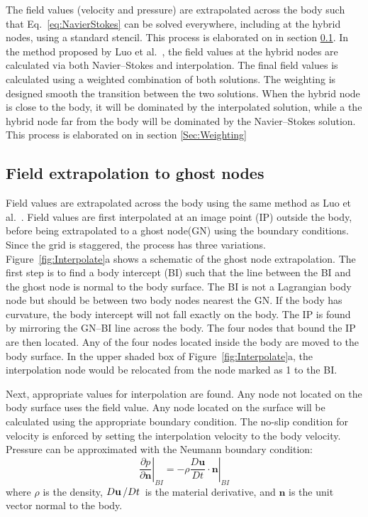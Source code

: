 \documentclass[onehalf,11pt]{beavtex}
\begin{document}
The field values (velocity and pressure) are extrapolated across the body such that Eq.~\eqref{eq:NavierStokes} can be solved everywhere, including at the hybrid nodes, using a standard stencil. 
This process is elaborated on in section \ref{Sec:Field Extrapolation}. 
In the method proposed by Luo et al.~\cite{Luo:2012gx}, the field values at the hybrid nodes are calculated via both Navier--Stokes and interpolation. 
The final field values is calculated using a weighted combination of both solutions.
The weighting is designed smooth the transition between the two solutions. 
When the hybrid node is close to the body, it will be dominated by the interpolated solution, while a the hybrid node far from the body will be dominated by the Navier--Stokes solution. 
This process is elaborated on in section \ref{Sec:Weighting}

\subsection{Field extrapolation to ghost nodes}
\label{Sec:Field Extrapolation}

Field values are extrapolated across the body using the same method as Luo et al.~\cite{Luo:2012gx}.
Field values are first interpolated at an image point (IP) outside the body, before being extrapolated to a ghost node(GN) using the boundary conditions.
Since the grid is staggered, the process has three variations.
Figure~\ref{fig:Interpolate}a shows a schematic of the ghost node extrapolation.
The first step is to find a body intercept (BI) such that the line between the BI and the ghost node is normal to the body surface.
The BI is not a Lagrangian body node but should be between two body nodes nearest the GN.
If the body has curvature, the body intercept will not fall exactly on the body.
The IP is found by mirroring the GN--BI line across the body.
The four nodes that bound the IP are then located.
Any of the four nodes located inside the body are moved to the body surface.
In the upper shaded box of Figure~\ref{fig:Interpolate}a, the interpolation node would be relocated from the node marked as 1 to the BI.

Next, appropriate values for interpolation are found.
Any node not located on the body surface uses the field value.
Any node located on the surface will be calculated using the appropriate boundary condition.
The no-slip condition for velocity is enforced by setting the interpolation velocity to the body velocity.
Pressure can be approximated with the Neumann boundary condition:
\begin{equation}
    \left. \frac{\partial p}{\partial \textbf{n}}\right|_{BI} = \left. -\rho \frac{D\textbf{u}}{Dt}\cdot \textbf{n}\right|_{BI}
    \label{eq:Neumann}
\end{equation}
where $\rho$ is the density, $D\textbf{u}\left/Dt\right.$ is the material derivative, and $\textbf{n}$ is the unit vector normal to the body.
\end{document}
